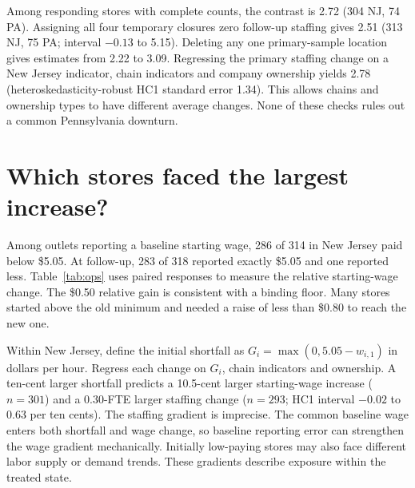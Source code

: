 \documentclass[11pt]{article}
\begin{document}
Among responding stores with complete counts, the contrast is 2.72 (304 NJ, 74 PA). Assigning all four temporary closures zero follow-up staffing gives 2.51 (313 NJ, 75 PA; interval $-0.13$ to 5.15). Deleting any one primary-sample location gives estimates from 2.22 to 3.09. Regressing the primary staffing change on a New Jersey indicator, chain indicators and company ownership yields 2.78 (heteroskedasticity-robust HC1 standard error 1.34). This allows chains and ownership types to have different average changes. None of these checks rules out a common Pennsylvania downturn.

\section{Which stores faced the largest increase?}
Among outlets reporting a baseline starting wage, 286 of 314 in New Jersey paid below \$5.05. At follow-up, 283 of 318 reported exactly \$5.05 and one reported less. Table~\ref{tab:ops} uses paired responses to measure the relative starting-wage change. The \$0.50 relative gain is consistent with a binding floor. Many stores started above the old minimum and needed a raise of less than \$0.80 to reach the new one.

Within New Jersey, define the initial shortfall as $G_i=\max(0,5.05-w_{i,1})$ in dollars per hour. Regress each change on $G_i$, chain indicators and ownership. A ten-cent larger shortfall predicts a 10.5-cent larger starting-wage increase ($n=301$) and a 0.30-FTE larger staffing change ($n=293$; HC1 interval $-0.02$ to 0.63 per ten cents). The staffing gradient is imprecise. The common baseline wage enters both shortfall and wage change, so baseline reporting error can strengthen the wage gradient mechanically. Initially low-paying stores may also face different labor supply or demand trends. These gradients describe exposure within the treated state.

\newpage
\end{document}
